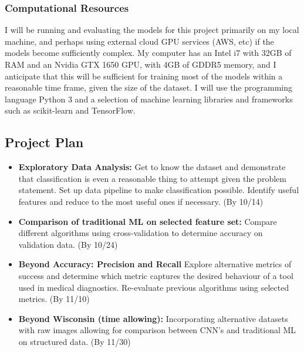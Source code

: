 \documentclass[11pt]{article}
\begin{document}
\subsubsection*{Computational Resources}
I will be running and evaluating the models for this project primarily on my local machine, and perhaps using external cloud GPU services (AWS, etc) if the models become sufficiently complex. My computer has an Intel i7 with 32GB of RAM and an Nvidia GTX 1650 GPU, with 4GB of GDDR5 memory, and I anticipate that this will be sufficient for training most of the models within a reasonable time frame, given the size of the dataset. I will use the programming language Python 3 and a selection of machine learning libraries and frameworks such as scikit-learn and TensorFlow.

\subsection*{Project Plan}
\begin{itemize}
\item \textbf{Exploratory Data Analysis:}
Get to know the dataset and demonstrate that classification is even a reasonable thing to attempt given the problem statement. Set up data pipeline to make classification possible. Identify useful features and reduce to the most useful ones if necessary. (By 10/14)
\item \textbf{Comparison of traditional ML on selected feature set:}
Compare different algorithms using cross-validation to determine accuracy on validation data. (By 10/24)
\item \textbf{Beyond Accuracy: Precision and Recall}
Explore alternative metrics of success and determine which metric captures the desired behaviour of a tool used in medical diagnostics. Re-evaluate previous algorithms using selected metrics. (By 11/10)
\item \textbf{Beyond Wisconsin (time allowing): } Incorporating alternative datasets with raw images allowing for comparison between CNN's and traditional ML on structured data. (By 11/30)
\end{itemize}

\nocite{*}


\end{document}
